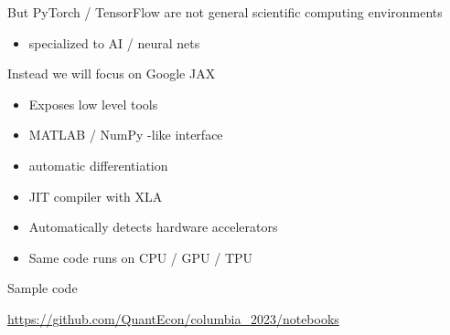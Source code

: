 \documentclass[
    xcolor={svgnames,dvipsnames},
    hyperref={colorlinks, citecolor=DeepPink4, linkcolor=DarkRed, urlcolor=DarkBlue}
    ]{beamer}  %
\newcommand{\1}{\mathbbm 1}
\begin{document}
\begin{frame}
    
    But PyTorch / TensorFlow are not general scientific computing environments

    \begin{itemize}
        \item specialized to AI / neural nets
    \end{itemize}

    \vspace{1em}

    \pause
    Instead we will focus on Google JAX

    \begin{itemize}
        \item Exposes low level tools
        \item MATLAB / NumPy -like interface
        \item automatic differentiation
        \item JIT compiler with XLA
        \item Automatically detects hardware accelerators
        \item Same code runs on CPU / GPU / TPU
    \end{itemize}


\end{frame}


\begin{frame}
    
    Sample code

    \url{https://github.com/QuantEcon/columbia_2023/notebooks}

\end{frame}
\end{document}
